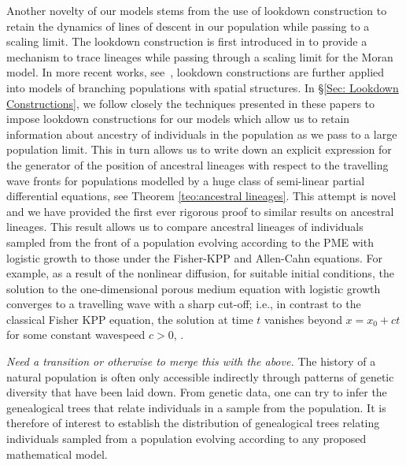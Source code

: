 \documentclass[12pt]{article}
\newcommand{\comment}[1]{{\color{blue} \it #1}}
\begin{document}
Another novelty of our models stems from the use of lookdown construction to retain the dynamics of lines of descent in our population while passing to a scaling limit. The lookdown construction is first introduced in \cite{donnelly/kurtz:1996} to provide a mechanism to trace lineages while passing through a scaling limit for the Moran model. In more recent works, see~\cite{kurtz/rodrigues:2011, etheridge/kurtz:2018}, lookdown constructions are further applied into models of branching populations with spatial structures. In \S \ref{Sec: Lookdown Constructions}, we follow closely the techniques presented in these papers to impose lookdown constructions for our models which allow us to retain information about ancestry of individuals in the population as we pass to a large population limit. This in turn allows us to write down an explicit expression for the generator of the position of ancestral lineages with respect to the travelling wave fronts for populations modelled by a huge class of semi-linear partial differential equations, see Theorem \ref{teo:ancestral lineages}.
This attempt is novel and we have provided the first ever rigorous proof to similar results on ancestral lineages. This result allows us to compare ancestral lineages of individuals sampled from the front of a population evolving according to the PME with logistic growth to those under the Fisher-KPP and Allen-Cahn equations. For example, as a result of the nonlinear diffusion, 
for suitable initial conditions, the solution to the one-dimensional 
porous medium equation with logistic growth converges to a travelling
wave with a sharp cut-off; i.e., in contrast to the classical 
Fisher KPP equation, the solution at time $t$
vanishes beyond $x=x_0+ct$ for some constant wavespeed
$c>0$, \cite{kamin/rosenau:2004}.

\comment{Need a transition or otherwise to merge this with the above.}
The history of a natural population is often only accessible indirectly 
through patterns of genetic diversity that have been laid down. From 
genetic data, one can try to infer the genealogical trees that relate 
individuals in a sample from the population. It is therefore of interest
to establish the distribution of genealogical trees relating individuals
sampled from a population evolving according to any proposed mathematical
model.
\end{document}
